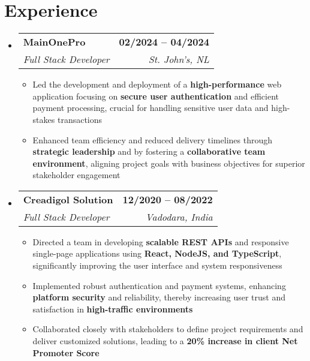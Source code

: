 \documentclass[letterpaper,11pt]{article}
\makeatletter
\newcommand{\resumeItem}[1]{
  \item\small{
    {#1 \vspace{-2pt}}
  }
}
\newcommand{\resumeSubheading}[4]{
  \vspace{-2pt}\item
    \begin{tabular*}{1.0\textwidth}[t]{l@{\extracolsep{\fill}}r}
      \textbf{#1} & \textbf{\small #2} \\
      \textit{\small#3} & \textit{\small #4} \\
    \end{tabular*}\vspace{-7pt}
}
\newcommand{\resumeSubHeadingListStart}{\begin{itemize}[leftmargin=0.0in, label={}]}
\newcommand{\resumeSubHeadingListEnd}{\end{itemize}}
\newcommand{\resumeItemListStart}{\begin{itemize}}
\newcommand{\resumeItemListEnd}{\end{itemize}\vspace{-5pt}}
\makeatother
\begin{document}
\section{Experience}
  \resumeSubHeadingListStart
    \resumeSubheading
      {MainOnePro}{02/2024 -- 04/2024}
      {Full Stack Developer}{St. John's, NL}
      \resumeItemListStart
        \resumeItem{Led the development and deployment of a \textbf{high-performance} web application focusing on \textbf{secure user authentication} and efficient payment processing, crucial for handling sensitive user data and high-stakes transactions}
        \resumeItem{Enhanced team efficiency and reduced delivery timelines through \textbf{strategic leadership} and by fostering a \textbf{collaborative team environment}, aligning project goals with business objectives for superior stakeholder engagement}
      \resumeItemListEnd
    \resumeSubheading
      {Creadigol Solution}{12/2020 -- 08/2022}
      {Full Stack Developer}{Vadodara, India}
      \resumeItemListStart
        \resumeItem{Directed a team in developing \textbf{scalable REST APIs} and responsive single-page applications using \textbf{React, NodeJS, and TypeScript}, significantly improving the user interface and system responsiveness}
        \resumeItem{Implemented robust authentication and payment systems, enhancing \textbf{platform security} and reliability, thereby increasing user trust and satisfaction in \textbf{high-traffic environments}}
        \resumeItem{Collaborated closely with stakeholders to define project requirements and deliver customized solutions, leading to a \textbf{20\% increase in client Net Promoter Score}}
      \resumeItemListEnd
  \resumeSubHeadingListEnd
\vspace{-16pt}




\end{document}
